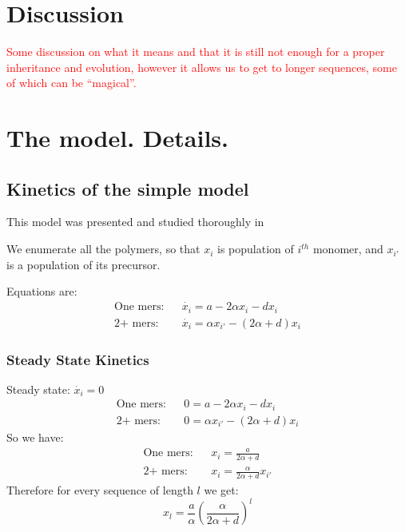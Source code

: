 \documentclass[12pt]{paper}
\newcommand{\ga}{\alpha}
\newcommand{\pt}[1]{\left( #1\right)}
\newcommand{\red}[1]{\textcolor{red}{#1}}
\begin{document}
\section{Discussion}
\red{Some discussion on what it means and that it is still not enough for a proper inheritance and 
evolution, however it allows us to get to longer sequences, some of which can be ``magical''.}

 \newpage
\appendix


\section{The model. Details.}
\subsection{Kinetics of the simple model}
This model was presented and studied thoroughly in 
\cite{nowak2008prevolutionary,Ohtsuki2009,Chen2012}

We enumerate all the polymers, so that $x_i$ is population of $i^{th}$ monomer, and $x_{i'}$ is a 
population of its precursor.

Equations are:
  \begin{eqnarray}
   \mbox{One mers:}&& \dot{x_i}=a-2\ga x_i-dx_i \\
     \mbox{2+ mers:}&& \dot{x_i}=\ga x_{i'}-(2\ga+d)x_i
  \end{eqnarray}

\subsubsection{Steady State Kinetics}\label{sec:nowak-steady}
Steady state: $\dot{x_i}=0$
  \begin{eqnarray}
   \mbox{One mers:}&& 0=a-2\ga x_i-dx_i \\
     \mbox{2+ mers:}&& 0=\ga x_{i'}-(2\ga+d)x_i
  \end{eqnarray}
  So we have:
   \begin{eqnarray}
   \mbox{One mers:}&& x_i=\frac{a}{2\ga+d} \\
     \mbox{2+ mers:}&& x_i=\frac{\ga}{2\ga+d}x_{i'}
  \end{eqnarray}   
 Therefore for every sequence of length $l$ we get:
   \begin{equation}
   \boxed{ x_l=\frac{a}{\ga}\pt{\frac{\ga}{2\ga+d}}^l}
   \end{equation} 
\end{document}
